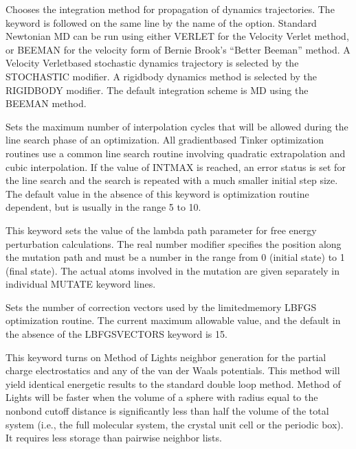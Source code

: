 \documentclass[letterpaper,11pt,english]{sphinxmanual}
\begin{document}



  Chooses the integration method for propagation of dynamics trajectories. The keyword is followed on the same line by the name of the option. Standard Newtonian MD can be run using either VERLET for the Velocity Verlet method, or BEEMAN for the velocity form of Bernie Brook’s “Better Beeman” method. A Velocity Verlet\sphinxhyphen{}based stochastic dynamics trajectory is selected by the STOCHASTIC modifier. A rigid\sphinxhyphen{}body dynamics method is selected by the RIGIDBODY modifier. The default integration scheme is MD using the BEEMAN method.

  Sets the maximum number of interpolation cycles that will be allowed during the line search phase of an optimization. All gradient\sphinxhyphen{}based Tinker optimization routines use a common line search routine involving quadratic extrapolation and cubic interpolation. If the value of INTMAX is reached, an error status is set for the line search and the search is repeated with a much smaller initial step size. The default value in the absence of this keyword is optimization routine dependent, but is usually in the range 5 to 10.


  This keyword sets the value of the lambda path parameter for free energy perturbation calculations. The real number modifier specifies the position along the mutation path and must be a number in the range from 0 (initial state) to 1 (final state). The actual atoms involved in the mutation are given separately in individual MUTATE keyword lines.

  Sets the number of correction vectors used by the limited\sphinxhyphen{}memory L\sphinxhyphen{}BFGS optimization routine. The current maximum allowable value, and the default in the absence of the LBFGS\sphinxhyphen{}VECTORS keyword is 15.


  This keyword turns on Method of Lights neighbor generation for the partial charge electrostatics and any of the van der Waals potentials. This method will yield identical energetic results to the standard double loop method. Method of Lights will be faster when the volume of a sphere with radius equal to the nonbond cutoff distance is significantly less than half the volume of the total system (i.e., the full molecular system, the crystal unit cell or the periodic box). It requires less storage than pairwise neighbor lists.
\end{document}
